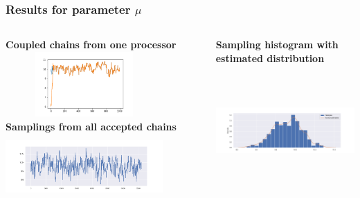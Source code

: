 \documentclass{beamer}
\begin{document}
\begin{frame}
	\frametitle{Results for parameter $\mu$}
	\begin{columns}
		\begin{column}{0.4\textwidth}
		{\scriptsize \textbf{Coupled chains from one processor}}\\
		\includegraphics[width=6cm,height=2.5cm]{doublecoupling_chainmeeting/doublecoupling_mu_chain_meeting}
		\vspace{0.2cm}
	{	\scriptsize \textbf{Samplings from all accepted chains }}\\
	\includegraphics[width=6cm,height=2.5cm]{doublecoupling_pack/doublecoupling_sampling_mu}
		\end{column}
	\begin{column}{0.4\textwidth}
		{\scriptsize \textbf{Sampling histogram with estimated distribution}}\\
		\includegraphics[width=6cm,height=5cm]{doublecoupling_pack/doublecoupling_mu_histogram_kernel}
	\end{column}
	\end{columns}
	
	
\end{frame}
\end{document}
